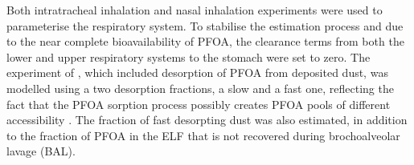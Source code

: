 \documentclass[preprint,12pt,authoryear]{elsarticle}
\begin{document}
Both intratracheal inhalation and nasal inhalation experiments were used to parameterise the respiratory system. To stabilise the estimation process and due to the near complete bioavailability of PFOA, the clearance terms from both the lower and upper respiratory systems to the stomach were set to zero. The experiment of \citet{gustafsson_2022}, which included desorption of PFOA from deposited dust, was modelled using a two desorption fractions, a slow and a fast one, reflecting the fact that the PFOA sorption process possibly creates PFOA pools of different accessibility \citep{gustafsson_2022}. The fraction of fast desorpting dust was also estimated, in addition to the fraction of PFOA in the ELF that is not recovered during brochoalveolar lavage (BAL).

\begin{table}[H]
\centering
\caption{Chemical-specific model parameters and scenario-related parameters.}
\label{Table:parameters}
\end{table}
\end{document}
